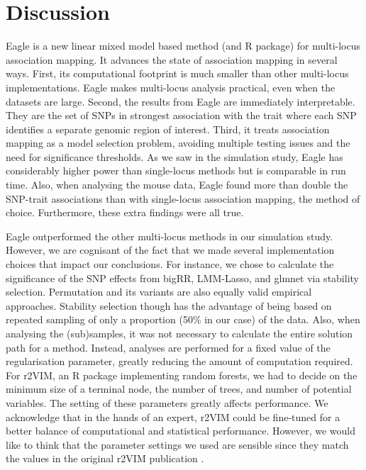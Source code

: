 \documentclass{nature}
\begin{document}
\section{Discussion}
Eagle is a new linear mixed model based method (and R package) for multi-locus association mapping. It advances the state of association mapping in several ways. 
First, its computational footprint is much smaller than other multi-locus implementations. Eagle makes multi-locus analysis 
practical, even when the datasets are large. Second, the results from
 Eagle are immediately interpretable. They are the set of SNPs in strongest association with the trait where 
each SNP identifies a separate genomic region of interest. Third, it treats association mapping as a model selection problem, avoiding 
multiple testing issues and the need for significance thresholds. 
 As we saw in the simulation study, Eagle has considerably higher power than single-locus methods but is comparable in run time.
Also, when analysing the mouse data, Eagle found more than double the SNP-trait associations than 
with single-locus association mapping, the method of choice. Furthermore, these extra findings were all true. 

Eagle outperformed the other multi-locus methods in our simulation study. However, we are cognisant of the fact  that we made several implementation 
choices that impact our conclusions.  For instance, we chose to calculate the significance of the 
SNP effects from bigRR, LMM-Lasso, and glmnet via stability selection.  Permutation and its variants \cite{ browning2008presto,pahl2010permory} are also equally valid empirical approaches. Stability selection though has the advantage of being based on repeated sampling of only a proportion (50\% in our case) of the 
data. Also, when analysing the (sub)samples, it was not necessary to calculate the entire solution path for a method. 
 Instead,  analyses are 
performed for a fixed value of the regularisation parameter, greatly reducing the amount of computation required. For r2VIM, an R package 
implementing random forests, we had to decide on the  minimum size of a terminal node, the number of trees, and number of potential variables. 
The setting of these parameters greatly affects performance.  We  acknowledge that in the hands of an expert, 
r2VIM could be fine-tuned for a better balance of computational and statistical performance. 
However, we would like to think that the parameter settings we used are sensible 
since they match the values in the original r2VIM publication \cite{szymczak2016r2vim}.
\end{document}
